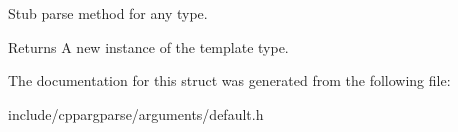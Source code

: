Stub parse method for any type. 

\begin{DoxyReturn}{Returns}
A new instance of the template type. 
\end{DoxyReturn}


The documentation for this struct was generated from the following file\+:\begin{DoxyCompactItemize}
\item 
include/cppargparse/arguments/default.\+h\end{DoxyCompactItemize}
